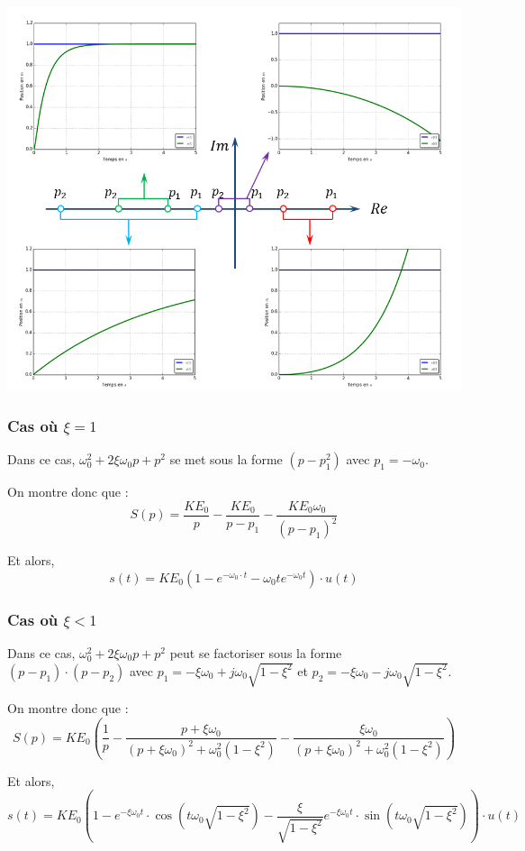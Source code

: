 \documentclass[10pt,fleqn]{article} %
\begin{document}
\begin{center}
 \includegraphics[width=.8\textwidth]{images/poles_1}
\end{center}

\subsubsection{Cas où $\xi=1$}
Dans ce cas, $\omega_0^2+2\xi\omega_0 p+ p^2$ se met sous la forme $\left( p-p_1^2\right) $ avec $p_1 = -\omega_0$.

On montre donc que :
$$
S(p)= \dfrac{KE_0}{p} - \dfrac{KE_0}{p-p_1} - \dfrac{KE_0 \omega_0}{\left(p-p_1\right)^2}
$$

Et alors, 
$$
s(t) = KE_0\left(1- e^{-\omega_0 \cdot t} -\omega_0 t  e^{-\omega_0t} \right) \cdot u(t)
$$

\subsubsection{Cas où $\xi<1$}
Dans ce cas, $\omega_0^2+2\xi\omega_0 p+p^2$ peut se factoriser sous la forme $\left(p-p_1\right)\cdot\left(p-p_2\right)$ avec $p_1 = -\xi\omega_0 + j \omega_0 \sqrt{1-\xi^2}$ et $p_2 = -\xi\omega_0 - j \omega_0 \sqrt{1-\xi^2}$.

On montre donc que :
$$
S(p)= KE_0\left( 
\dfrac{1}{p}
-\dfrac{p+\xi\omega_0}{\left( p+\xi\omega_0\right)^2+\omega_0^2\left(1-\xi^2\right)}
-\dfrac{\xi\omega_0}{\left( p+\xi\omega_0\right)^2+\omega_0^2\left(1-\xi^2\right)}
\right)
$$

Et alors, 
$$
s(t) = KE_0\left(1
- e^{-\xi\omega_0 t}\cdot\cos \left(t\omega_0 \sqrt{1-\xi^2} \right)
- \dfrac{\xi}{\sqrt{1-\xi^2}} e^{-\xi\omega_0 t}\cdot\sin \left(t\omega_0 \sqrt{1-\xi^2} \right)
\right) \cdot u(t)
$$
\end{document}
